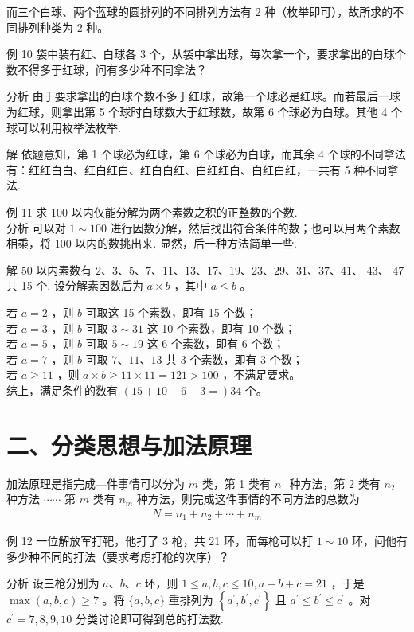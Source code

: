 \documentclass[10pt]{article}
\begin{document}
而三个白球、两个蓝球的圆排列的不同排列方法有 2 种（枚举即可），故所求的不同排列种类为 2 种。

例 10 袋中装有红、白球各 3 个，从袋中拿出球，每次拿一个，要求拿出的白球个数不得多于红球，问有多少种不同拿法？

分析 由于要求拿出的白球个数不多于红球，故第一个球必是红球。而若最后一球为红球，则拿出第 5 个球时白球数大于红球数，故第 6 个球必为白球。其他 4 个球可以利用枚举法枚举.

解 依题意知，第 1 个球必为红球，第 6 个球必为白球，而其余 4 个球的不同拿法有：红红白白、红白红白、红白白红、白红红白、白红白红，一共有 5 种不同拿法.

例 11 求 100 以内仅能分解为两个素数之积的正整数的个数.\\
分析 可以对 $1 \sim 100$ 进行因数分解，然后找出符合条件的数；也可以用两个素数相乘，将 100 以内的数挑出来. 显然，后一种方法简单一些.

解 50 以内素数有 $2 、 3 、 5 、 7 、 11 、 13 、 17 、 19 、 23 、 29 、 31 、 37 、 41 、$ 43、 47 共 15 个. 设分解素因数后为 $a \times b$ ，其中 $a \leqslant b$ 。

若 $a=2$ ，则 $b$ 可取这 15 个素数，即有 15 个数；\\
若 $a=3$ ，则 $b$ 可取 $3 \sim 31$ 这 10 个素数，即有 10 个数；\\
若 $a=5$ ，则 $b$ 可取 $5 \sim 19$ 这 6 个素数，即有 6 个数；\\
若 $a=7$ ，则 $b$ 可取 $7 、 11 、 13$ 共 3 个素数，即有 3 个数；\\
若 $a \geqslant 11$ ，则 $a \times b \geqslant 11 \times 11=121>100$ ，不满足要求。\\
综上，满足条件的数有 $(15+10+6+3=) 34$ 个。

\section{二、分类思想与加法原理}
加法原理是指完成—件事情可以分为 $m$ 类，第 1 类有 $n_{1}$ 种方法，第 2 类有 $n_{2}$ 种方法 $\cdots \cdots$ 第 $m$ 类有 $n_{m}$ 种方法，则完成这件事情的不同方法的总数为\\
\begin{align*}
N=n_{1}+n_{2}+\cdots+n_{m}
\end{align*}

例 12 一位解放军打靶，他打了 3 枪，共 21 环，而每枪可以打 $1 \sim 10$ 环，问他有多少种不同的打法（要求考虑打枪的次序）？

分析 设三枪分别为 $a 、 b 、 c$ 环，则 $1 \leqslant a, b, c \leqslant 10, a+b+c=21$ ，于是 $\max (a, b, c) \geqslant 7$ 。将 $\{a, b, c\}$ 重排列为 $\left\{a^{\prime}, b^{\prime}, c^{\prime}\right\}$ 且 $a^{\prime} \leqslant b^{\prime} \leqslant c^{\prime}$ 。对 $c^{\prime}=7,8,9,10$ 分类讨论即可得到总的打法数.
\end{document}
